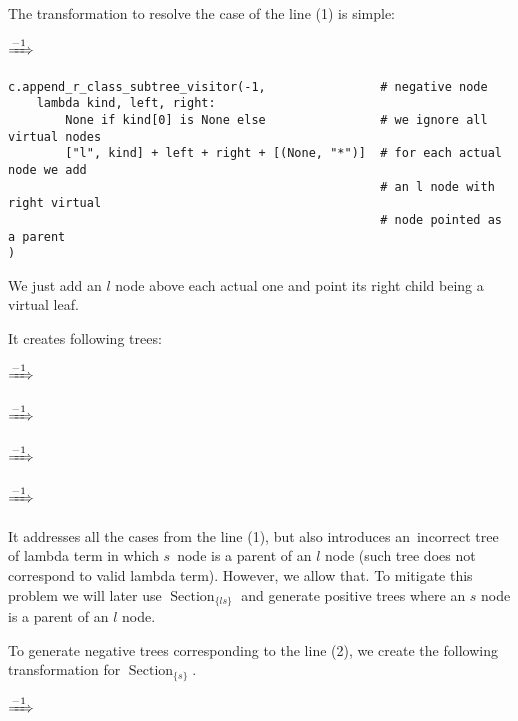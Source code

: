 \documentclass[final]{article}
\theoremstyle{definition}
\theoremstyle{definition}
\theoremstyle{remark}
\DeclareMathOperator{\tSection}{\text{Section}}
\newcommand{\includeinlinesvg}[2]{\begin{minipage}{#1\textwidth}\end{minipage}}
\newcommand{\includeinlinescaledsvg}[3]{\begin{minipage}{#1\textwidth}\begin{center}\end{center}\end{minipage}}
\begin{document}
The transformation to resolve the case of the line (1) is simple:

\begin{center}
    \includeinlinescaledsvg{.4}{.7}{lambda__transformations__002a}%
    \(\xRightarrow{-1}\)%
    \includeinlinescaledsvg{.4}{.7}{lambda__transformations__002b}%
\end{center}

\begin{lstlisting}
c.append_r_class_subtree_visitor(-1,                # negative node
    lambda kind, left, right:
        None if kind[0] is None else                # we ignore all virtual nodes
        ["l", kind] + left + right + [(None, "*")]  # for each actual node we add
                                                    # an l node with right virtual
                                                    # node pointed as a parent
)
\end{lstlisting}

We just add an \(l\) node above each actual one and point its right child being a virtual leaf.

It creates following trees:

\includeinlinesvg{.24}{lambda__trees_100__0_base}\(\xRightarrow{-1}\)\includeinlinesvg{.24}{lambda__trees_100__0}%
\includeinlinesvg{.24}{lambda__trees_100__1_base}\(\xRightarrow{-1}\)\includeinlinesvg{.24}{lambda__trees_100__1}%

\includeinlinesvg{.24}{lambda__trees_100__2_base}\(\xRightarrow{-1}\)\includeinlinesvg{.24}{lambda__trees_100__2}%
\includeinlinesvg{.24}{lambda__trees_100__3_base}\(\xRightarrow{-1}\)\includeinlinesvg{.24}{lambda__trees_100__3}%

It addresses all the cases from the line (1), but also introduces an~incorrect tree of lambda term in which \(s\)~node is a parent of an \(l\) node (such tree does not correspond to valid lambda term). However, we allow that. To mitigate this problem we will later use \(\tSection_{\{ls\}}\) and generate positive trees where an \(s\) node is a parent of an \(l\) node.

To generate negative trees corresponding to the line (2), we create the following transformation for \(\tSection_{\{s\}}\).

\begin{center}
    \includeinlinescaledsvg{.4}{.7}{lambda__transformations__003a}%
    \(\xRightarrow{-1}\)%
    \includeinlinescaledsvg{.4}{.7}{lambda__transformations__003b}%
\end{center}
\end{document}
